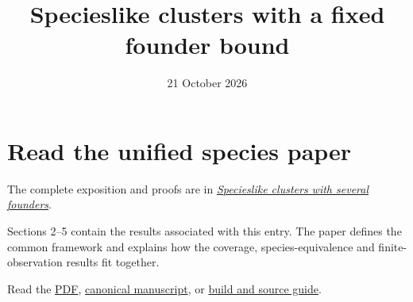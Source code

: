 \documentclass[
  11pt,
  letterpaper,
]{article}
\title{Specieslike clusters with a fixed founder bound}
\author{}
\date{21 October 2026}
\begin{document}
\maketitle

\section{Read the unified species
paper}\label{read-the-unified-species-paper}

The complete exposition and proofs are in
\href{../06-founding-cohort-species/founding-cohort-species.pdf}{\emph{Specieslike
clusters with several founders}}.

Sections 2--5 contain the results associated with this entry. The paper
defines the common framework and explains how the coverage,
species-equivalence and finite-observation results fit together.

Read the
\href{../06-founding-cohort-species/founding-cohort-species.pdf}{PDF},
\href{../06-founding-cohort-species/founding-cohort-species.md}{canonical
manuscript}, or \href{../06-founding-cohort-species/README.md}{build and
source guide}.
\end{document}
